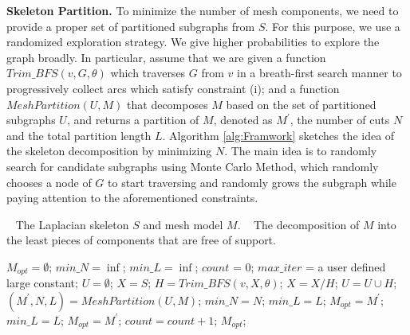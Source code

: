 \textbf{Skeleton Partition.} {{To minimize the number of mesh components, we need to provide a proper set of partitioned subgraphs from $S$.}}
For this purpose, we use a randomized exploration strategy. We give higher probabilities to explore the graph broadly. In particular, assume that we are given a function $Trim\_BFS(v, G, \theta)$ which traverses $G$ from $v$ in a breath-first search manner to progressively collect arcs which satisfy constraint (i); and a function $MeshPartition(U, M)$ that decomposes $M$ based on the set of partitioned subgraphs $U$, and returns a partition of $M$, denoted as $M^{'}$, the number of cuts $N$ and the total partition length $L$. Algorithm \ref{alg:Framwork} sketches the idea of the skeleton decomposition {{by minimizing $N$}}. The main idea is to randomly search for candidate subgraphs using Monte Carlo Method, which randomly chooses a node of $G$ to start traversing and randomly grows the subgraph while paying attention to the aforementioned constraints.

\begin{algorithm}
\caption{$Skeleton\_Mesh\_Decomposition(S, M)$}
\label{alg:Framwork}
\begin{algorithmic}[1]
\REQUIRE~
The Laplacian skeleton $S$ and mesh model $M$.
\ENSURE~
The decomposition of $M$ into the least pieces of components that are free of support.

\STATE $M_{opt} = \emptyset$; $min\_N = \inf$; $min\_L = \inf$; $count$ = 0; $max\_iter$ = a user defined large constant;
\STATE  $U= \emptyset$;
\STATE  $X= S$;
\STATE $H = Trim\_BFS(v, X, \theta)$;
\STATE $X = X / H$;
\STATE $U = U \cup H$;
\ENDWHILE
\STATE $(M^{'}, N, L) = MeshPartition(U , M)$;
\STATE  $min\_N = N$;
\STATE  $min\_L = L$;
\STATE  $M_{opt} = M^{'}$;
\STATE  $min\_L = L$;
\STATE  $M_{opt} = M^{'}$;
\ENDIF
\STATE $count =count + 1$;
\ENDWHILE
\RETURN  $M_{opt}$;
\label{code:fram:select} \\
\end{algorithmic}
\end{algorithm}

